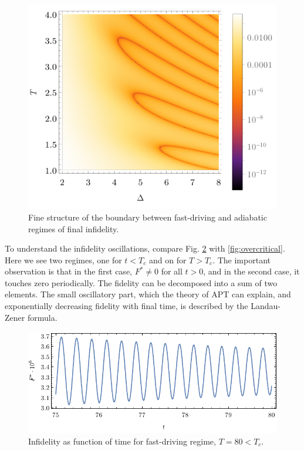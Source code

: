 \begin{figure}[H]
    \centering 
    \includegraphics[scale=1.2]{../img/dens2Zoom.pdf}
    \caption{Fine structure of the boundary between fast-driving and adiabatic regimes of final infidelity.}
    \label{fig:dens2Zoom}
\end{figure}



To understand the infidelity oscillations, compare Fig. \ref{fig:undercritical} with \ref{fig:overcritical}. Here we see two regimes, one for $t<T_c$ and on for $T>T_c$. The important observation is that in the first case, $F^*\neq 0$ for all $t>0$, and in the second case, it touches zero periodically. The fidelity can be decomposed into a sum of two elements. The small oscillatory part, which the theory of APT can explain, and exponentially decreasing fidelity with final time, is described by the Landau-Zener formula.

\begin{figure}[H]
    \centering
    \includegraphics[scale=1.2]{../img/undercritical.pdf}
    \caption{Infidelity as function of time for fast-driving regime, $T=80<T_c$.}
    \label{fig:undercritical}
\end{figure}

